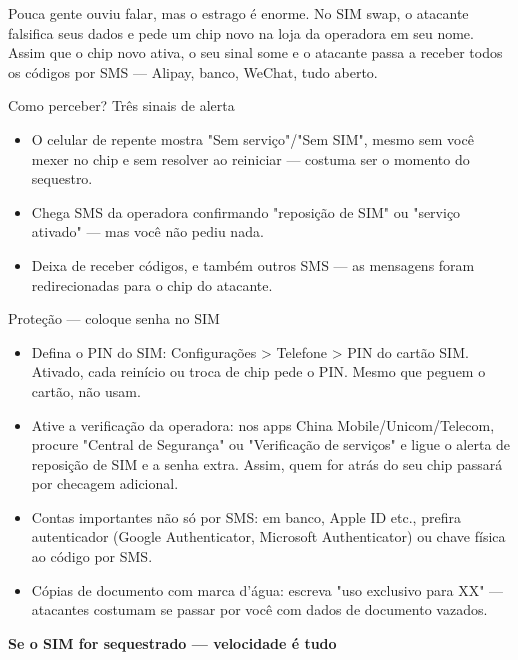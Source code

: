 
Pouca gente ouviu falar, mas o estrago é enorme. No SIM swap, o atacante falsifica seus dados e pede um chip novo na loja da operadora em seu nome. Assim que o chip novo ativa, o seu sinal some e o atacante passa a receber todos os códigos por SMS — Alipay, banco, WeChat, tudo aberto.

\begin{tcbinfo}{Como perceber? Três sinais de alerta}
\begin{itemize}
  \item O celular de repente mostra "Sem serviço"/"Sem SIM", mesmo sem você mexer no chip e sem resolver ao reiniciar — costuma ser o momento do sequestro.
  \item Chega SMS da operadora confirmando "reposição de SIM" ou "serviço ativado" — mas você não pediu nada.
  \item Deixa de receber códigos, e também outros SMS — as mensagens foram redirecionadas para o chip do atacante.
\end{itemize}

\end{tcbinfo}

\begin{tcbwarn}{Proteção — coloque senha no SIM}
\begin{itemize}
  \item Defina o PIN do SIM: Configurações > Telefone > PIN do cartão SIM. Ativado, cada reinício ou troca de chip pede o PIN. Mesmo que peguem o cartão, não usam.
  \item Ative a verificação da operadora: nos apps China Mobile/Unicom/Telecom, procure "Central de Segurança" ou "Verificação de serviços" e ligue o alerta de reposição de SIM e a senha extra. Assim, quem for atrás do seu chip passará por checagem adicional.
  \item Contas importantes não só por SMS: em banco, Apple ID etc., prefira autenticador (Google Authenticator, Microsoft Authenticator) ou chave física ao código por SMS.
  \item Cópias de documento com marca d'água: escreva "uso exclusivo para XX" — atacantes costumam se passar por você com dados de documento vazados.
\end{itemize}

\end{tcbwarn}

\textbf{Se o SIM for sequestrado — velocidade é tudo}\par

